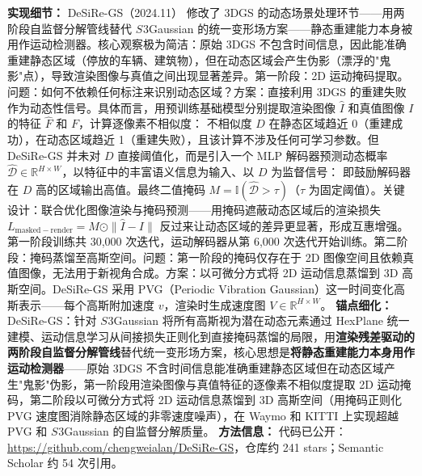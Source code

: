 \textbf{实现细节：} DeSiRe-GS（2024.11） 修改了 3DGS 的动态场景处理环节——用两阶段自监督分解管线替代 $S^{}3$Gaussian 的统一变形场方案——静态重建能力本身被用作运动检测器。核心观察极为简洁：原始 3DGS 不包含时间信息，因此能准确重建静态区域（停放的车辆、建筑物），但在动态区域会产生伪影（漂浮的"鬼影"点），导致渲染图像与真值之间出现显著差异。第一阶段：2D 运动掩码提取。问题：如何不依赖任何标注来识别动态区域？方案：直接利用 3DGS 的重建失败作为动态性信号。具体而言，用预训练基础模型分别提取渲染图像 $\hat{I}$ 和真值图像 $I$ 的特征 $\hat{F}$ 和 $F$，计算逐像素不相似度： 不相似度 $D$ 在静态区域趋近 0（重建成功），在动态区域趋近 1（重建失败），且该计算不涉及任何可学习参数。但 DeSiRe-GS 并未对 $D$ 直接阈值化，而是引入一个 MLP 解码器预测动态概率 $\hat{\mathcal{D}} \in \mathbb{R}^{H \times W}$，以特征中的丰富语义信息为输入、以 $D$ 为监督信号： 即鼓励解码器在 $D$ 高的区域输出高值。最终二值掩码 $M = \mathbb{I}(\hat{\mathcal{D}} > \tau)$（$\tau$ 为固定阈值）。关键设计：联合优化图像渲染与掩码预测——用掩码遮蔽动态区域后的渲染损失 $L_{\mathrm{masked-render}} = M \odot \|\hat{I} - I\|$ 反过来让动态区域的差异更显著，形成互惠增强。第一阶段训练共 30,000 次迭代，运动解码器从第 6,000 次迭代开始训练。第二阶段：掩码蒸馏至高斯空间。问题：第一阶段的掩码仅存在于 2D 图像空间且依赖真值图像，无法用于新视角合成。方案：以可微分方式将 2D 运动信息蒸馏到 3D 高斯空间。DeSiRe-GS 采用 PVG（Periodic Vibration Gaussian）这一时间变化高斯表示——每个高斯附加速度 $v$，渲染时生成速度图 $V \in \mathbb{R}^{H \times W}$。
\textbf{锚点细化：} DeSiRe-GS：针对 $S^{}3$Gaussian 将所有高斯视为潜在动态元素通过 HexPlane 统一建模、运动信息学习从间接损失正则化到直接掩码蒸馏的局限，用\textbf{渲染残差驱动的两阶段自监督分解管线}替代统一变形场方案，核心思想是\textbf{将静态重建能力本身用作运动检测器}——原始 3DGS 不含时间信息能准确重建静态区域但在动态区域产生"鬼影"伪影，第一阶段用渲染图像与真值特征的逐像素不相似度提取 2D 运动掩码，第二阶段以可微分方式将 2D 运动信息蒸馏到 3D 高斯空间（用掩码正则化 PVG 速度图消除静态区域的非零速度噪声），在 Waymo 和 KITTI 上实现超越 PVG 和 $S^{}3$Gaussian 的自监督分解质量。
\textbf{方法信息：} 代码已公开：\url{https://github.com/chengweialan/DeSiRe-GS}，仓库约 241 stars；Semantic Scholar 约 54 次引用。



